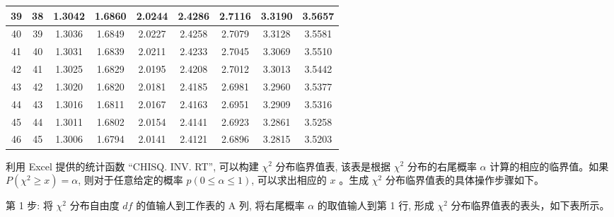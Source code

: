 \documentclass[10pt]{article}
\begin{document}
\begin{CJK*}{UTF8}{bsmi}
\begin{center}
\begin{tabular}{|c|c|c|c|c|c|c|c|c|}
\hline
39 & 38 & 1.3042 & 1.6860 & 2.0244 & 2.4286 & 2.7116 & 3.3190 & 3.5657 \\
\hline
40 & 39 & 1.3036 & 1.6849 & 2.0227 & 2.4258 & 2.7079 & 3.3128 & 3.5581 \\
\hline
41 & 40 & 1.3031 & 1.6839 & 2.0211 & 2.4233 & 2.7045 & 3.3069 & 3.5510 \\
\hline
42 & 41 & 1.3025 & 1.6829 & 2.0195 & 2.4208 & 2.7012 & 3.3013 & 3.5442 \\
\hline
43 & 42 & 1.3020 & 1.6820 & 2.0181 & 2.4185 & 2.6981 & 3.2960 & 3.5377 \\
\hline
44 & 43 & 1.3016 & 1.6811 & 2.0167 & 2.4163 & 2.6951 & 3.2909 & 3.5316 \\
\hline
45 & 44 & 1.3011 & 1.6802 & 2.0154 & 2.4141 & 2.6923 & 3.2861 & 3.5258 \\
\hline
46 & 45 & 1.3006 & 1.6794 & 2.0141 & 2.4121 & 2.6896 & 3.2815 & 3.5203 \\
\hline
\end{tabular}
\end{center}

\begin{center}
\end{center}

利用 Excel 提供的统计函数 “CHISQ. INV. RT”, 可以构建 $\chi^{2}$ 分布临界值表, 该表是根据 $\chi^{2}$ 分布的右尾概率 $\alpha$ 计算的相应的临界值。如果 $P\left(\chi^{2} \geqslant x\right)=\alpha$, 则对于任意给定的概率 $p(0 \leqslant \alpha \leqslant 1)$, 可以求出相应的 $x$ 。生成 $\chi^{2}$ 分布临界值表的具体操作步骤如下。

第 1 步: 将 $\chi^{2}$ 分布自由度 $d f$ 的值输人到工作表的 $\mathrm{A}$ 列, 将右尾概率 $\alpha$ 的取值输人到第 1 行, 形成 $\chi^{2}$ 分布临界值表的表头，如下表所示。


\end{CJK*}
\end{document}
